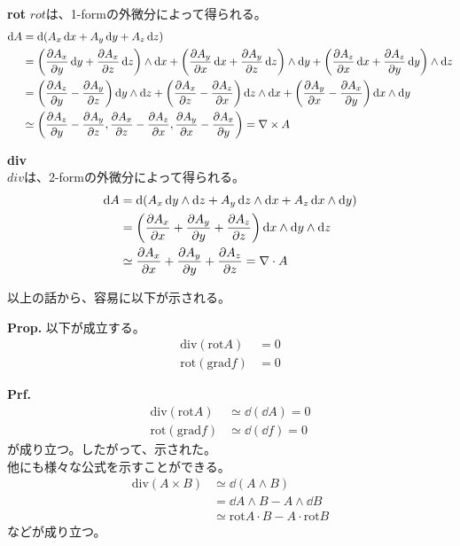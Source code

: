 \documentclass[a4paper,11pt]{jsarticle}
\numberwithin{equation}{section}
\begin{document}
\textbf{rot}
$rot$は、1-formの外微分によって得られる。
\begin{align}
  \dd{A} &= \dd({A_x\dd{x}}+A_y\dd{y}+A_z\dd{z} )\\
  &= \qty(\pdv{A_x}{y}\dd{y}+\pdv{A_x}{z}\dd{z} ) \wedge \dd{x} + \qty(\pdv{A_y}{x}\dd{x}+\pdv{A_y}{z}\dd{z})\wedge \dd{y} + \qty(\pdv{A_z}{x}\dd{x}+\pdv{A_z}{y}\dd{y}) \wedge \dd{z}\\
  &= \qty(\pdv{A_z}{y}-\pdv{A_y}{z})\dd{y}\wedge \dd{z} + \qty(\pdv{A_x}{z}-\pdv{A_z}{x})\dd{z}\wedge \dd{x} + \qty(\pdv{A_y}{x}-\pdv{A_x}{y})\dd{x}\wedge \dd{y}\\
  &\simeq \qty(\pdv{A_z}{y}-\pdv{A_y}{z},\pdv{A_x}{z}-\pdv{A_z}{x},\pdv{A_y}{x}-\pdv{A_x}{y}) = \nabla \times {A}
\end{align}

\textbf{div}\\
$div$は、2-formの外微分によって得られる。
\begin{align}
  \dd{A} &= \dd({A_x\dd{y}\wedge \dd{z} + A_y\dd{z}\wedge \dd{x} + A_z\dd{x}\wedge \dd{y}})\\
  &= \qty(\pdv{A_x}{x}+\pdv{A_y}{y}+\pdv{A_z}{z})\dd{x}\wedge \dd{y}\wedge \dd{z}\\
  &\simeq \pdv{A_x}{x}+\pdv{A_y}{y}+\pdv{A_z}{z} = \nabla \cdot {A}
\end{align}

以上の話から、容易に以下が示される。
\begin{itembox}[l]{\textbf{Prop.}}
  以下が成立する。
  \begin{align}
    \text{div}(\text{rot}A) &= 0\\
    \text{rot}(\text{grad}f) &= 0
  \end{align}
\end{itembox}
\textbf{Prf.}\\
\begin{align}
  \text{div}(\text{rot}A) &\simeq \dd(\dd{A}) =0\\
  \text{rot}(\text{grad}f) &\simeq \dd(\dd{f}) =0
\end{align}
が成り立つ。したがって、示された。\hfill\qedsymbol\\

他にも様々な公式を示すことができる。
\begin{align}
  \text{div}(A \times B) &\simeq \dd (A \wedge B)\\
  &= \dd A \wedge B - A \wedge \dd B\\
  &\simeq \text{rot}A \cdot B - A \cdot \text{rot}B
\end{align}
などが成り立つ。
\end{document}
